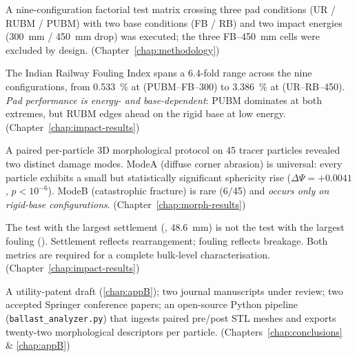 \begin{finding}[title=Experimental campaign]
A nine-configuration factorial test matrix crossing three pad conditions
(\gls{UR} / \gls{RUBM} / \gls{PUBM}) with two base conditions
(\gls{FB} / \gls{RB}) and two impact energies
(\SI{300}{\milli\metre} / \SI{450}{\milli\metre} drop) was executed; the
three \gls{FB}--\SI{450}{\milli\metre} cells were excluded by design.
\hfill (Chapter~\ref{chap:methodology})
\end{finding}

\begin{finding}[title=Bulk fouling response]
The Indian Railway Fouling Index \FIIN{} spans a 6.4-fold range across
the nine configurations, from \SI{0.533}{\percent} at 
(\gls{PUBM}--\gls{FB}--300) to \SI{3.386}{\percent} at 
(\gls{UR}--\gls{RB}--450). \emph{Pad performance is energy- and
base-dependent}: \gls{PUBM} dominates at both extremes, but \gls{RUBM}
edges ahead on the rigid base at low energy.
\hfill (Chapter~\ref{chap:impact-results})
\end{finding}

\begin{finding}[title=Two damage modes (Mode A / Mode B)]
A paired per-particle 3D morphological protocol on 45 tracer particles
revealed two distinct damage modes. \gls{ModeA} (diffuse corner
abrasion) is universal: every particle exhibits a small but
statistically significant sphericity rise
($\Delta\Psi = +0.0041$, $p < 10^{-6}$). \gls{ModeB} (catastrophic
fracture) is rare (6/45) and \emph{occurs only on rigid-base
configurations}.
\hfill (Chapter~\ref{chap:morph-results})
\end{finding}

\begin{finding}[title=Settlement vs.\ fouling are non-interchangeable]
The test with the largest settlement (,
\SI{48.6}{\milli\metre}) is not the test with the largest fouling
(). Settlement reflects rearrangement; fouling reflects
breakage. Both metrics are required for a complete bulk-level
characterisation.
\hfill (Chapter~\ref{chap:impact-results})
\end{finding}

\begin{finding}[title=Output]
A utility-patent draft (\cref{chap:appB}); two journal manuscripts
under review; two accepted Springer conference papers; an open-source
Python pipeline (\texttt{ballast\_analyzer.py}) that ingests paired
pre/post \gls{STL} meshes and exports twenty-two morphological
descriptors per particle.
\hfill (Chapters~\ref{chap:conclusions} \& \ref{chap:appB})
\end{finding}

\endgroup
